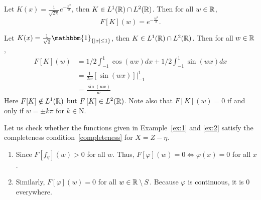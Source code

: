 \begin{example}
    \label{ex:1}
    Let $K(x)=\frac{1}{\sqrt{2\pi}}e^{-\frac{x^2}{2}}$, then $K\in L^1(\mathbb{R})\cap L^2(\mathbb{R})$. Then for all $w\in \mathbb{R}$, $$F[K](w)=e^{-\frac{w^2}{2}}.$$
\end{example}
\begin{example}
    \label{ex:2}
    Let $K(x)=\frac{1}{\sqrt{2}}\mathbbm{1}_{\{ \abs{x}\le 1\}}$, then $K\in L^1(\mathbb{R})\cap L^2(\mathbb{R})$. Then for all $w\in \mathbb{R}$,
    \begin{align*}
        F[K](w) & =1/2\int_{-1}^1 \cos(wx)dx+1/2\int_{-1}^1 \sin(wx)dx \\
                & =\frac{1}{2w}[\sin(wx)]\Big\vert_{-1}^1              \\
                & =\frac{\sin(wx)}{w}
    \end{align*}
    Here $F[K]\notin L^1(\mathbb{R})$ but $F\left[K\right]\in L^2(\mathbb{R})$. Note also that $F[K](w)=0$ if and only if $w=\pm k\pi$ for $k\in \mathrm{N}$.
\end{example}

Let us check whether the functions given in Example~\ref{ex:1} and \ref{ex:2}
satisfy the completeness condition~\ref{completeness} for $X=Z-\eta$.
\begin{enumerate}
    \item Since $F[f_\eta](w)>0$ for all $w$. Thus, $F[\varphi](w)=0\Leftrightarrow
              \varphi(x)=0$ for all $x$.
    \item Similarly, $F[\varphi](w)=0$ for all $w\in \mathbb{R}\setminus S$. Because $\varphi$ is
          continuous, it is $0$ everywhere.
\end{enumerate}